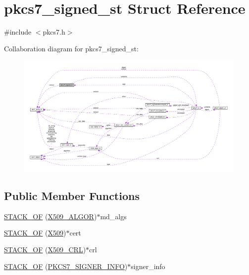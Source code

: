 \hypertarget{structpkcs7__signed__st}{}\section{pkcs7\+\_\+signed\+\_\+st Struct Reference}
\label{structpkcs7__signed__st}


{\ttfamily \#include $<$pkcs7.\+h$>$}



Collaboration diagram for pkcs7\+\_\+signed\+\_\+st\+:
\nopagebreak
\begin{figure}[H]
\begin{center}
\leavevmode
\includegraphics[width=350pt]{structpkcs7__signed__st__coll__graph}
\end{center}
\end{figure}
\subsection*{Public Member Functions}
\begin{DoxyCompactItemize}
\item 
\hyperlink{structpkcs7__signed__st_a95443d219319ec0509277c13ada0d372}{S\+T\+A\+C\+K\+\_\+\+OF} (\hyperlink{ossl__typ_8h_aa2b6185e6254f36f709cd6577fb5022e}{X509\+\_\+\+A\+L\+G\+OR})$\ast$md\+\_\+algs
\item 
\hyperlink{structpkcs7__signed__st_a458cc3ee1d42283dabf58b5e4d39f316}{S\+T\+A\+C\+K\+\_\+\+OF} (\hyperlink{ossl__typ_8h_a4f666bde6518f95deb3050c54b408416}{X509})$\ast$cert
\item 
\hyperlink{structpkcs7__signed__st_ab2c9d5399f9f26e97f8410463f167243}{S\+T\+A\+C\+K\+\_\+\+OF} (\hyperlink{ossl__typ_8h_ac8661d2485c2c8da5fd7dd26b846f4bf}{X509\+\_\+\+C\+RL})$\ast$crl
\item 
\hyperlink{structpkcs7__signed__st_a02a1203d796aa79c223fe6d3d5e3619b}{S\+T\+A\+C\+K\+\_\+\+OF} (\hyperlink{pkcs7_8h_a827824ab5bc7870ffbc5213959710815}{P\+K\+C\+S7\+\_\+\+S\+I\+G\+N\+E\+R\+\_\+\+I\+N\+FO})$\ast$signer\+\_\+info
\end{DoxyCompactItemize}
